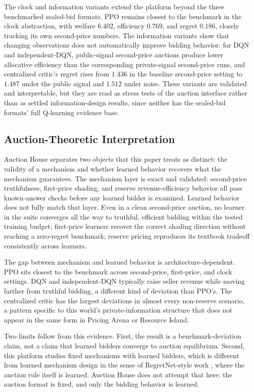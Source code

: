 \documentclass[11pt]{article}
\begin{document}
The clock and information variants extend the platform beyond the three
benchmarked sealed-bid formats. PPO remains closest to the benchmark in the
clock abstraction, with welfare \(6.402\), efficiency \(0.769\), and regret
\(0.186\), closely tracking its own second-price numbers. The information
variants show that changing observations does not automatically improve bidding
behavior: for DQN and independent-DQN, public-signal second-price auctions
produce lower allocative efficiency than the corresponding private-signal
second-price runs, and centralized critic's regret rises from \(1.436\) in the
baseline second-price setting to \(1.487\) under the public signal and \(1.512\)
under noise. These variants are validated and interpretable, but they are read
as stress tests of the auction interface rather than as settled
information-design results, since neither has the sealed-bid formats' full
Q-learning evidence base.

\subsection{Auction-Theoretic Interpretation}

Auction House separates two objects that this paper treats as distinct: the
validity of a mechanism and whether learned behavior recovers what the mechanism
guarantees. The mechanism layer is exact and validated: second-price
truthfulness, first-price shading, and reserve revenue-efficiency behavior all
pass known-answer checks before any learned bidder is examined. Learned behavior
does not fully match that layer. Even in a clean second-price auction, no
learner in the suite converges all the way to truthful, efficient bidding within
the tested training budget; first-price learners recover the correct shading
direction without reaching a zero-regret benchmark; reserve pricing reproduces
its textbook tradeoff consistently across learners.

The gap between mechanism and learned behavior is architecture-dependent. PPO
sits closest to the benchmark across second-price, first-price, and clock
settings. DQN and independent-DQN typically raise seller revenue while moving
farther from truthful bidding, a different kind of deviation than PPO's. The
centralized critic has the largest deviations in almost every non-reserve
scenario, a pattern specific to this world's private-information structure that
does not appear in the same form in Pricing Arena or Resource Island.

Two limits follow from this evidence. First, the result is a
benchmark-deviation claim, not a claim that learned bidders converge to auction
equilibrium. Second, this platform studies fixed mechanisms with learned
bidders, which is different from learned mechanism design in the sense of
RegretNet-style work \citep{dutting2019}, where the auction rule itself is
learned. Auction House does not attempt that here: the auction format is fixed,
and only the bidding behavior is learned.
\end{document}

